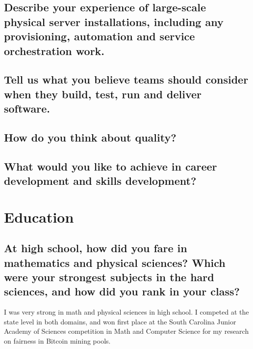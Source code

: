 \documentclass{article}
\begin{document}
\subsection{Describe your experience of large-scale physical server
    installations, including any provisioning, automation and service orchestration
    work.}
\subsection{Tell us what you believe teams should consider when they build,
    test, run and deliver software.}
\subsection{How do you think about quality?}



\subsection{What would you like to achieve in career development and skills
    development?}

\section{Education}
\subsection{At high school, how did you fare in mathematics
    and physical sciences? Which were your strongest subjects in the hard sciences,
    and how did you rank in your class?}

I was very strong in math and physical sciences in high school. I competed at the state level
in both domains, and won first place at the South Carolina Junior Academy of Sciences competition
in Math and Computer Science for my research on fairness in Bitcoin mining pools.
\end{document}
